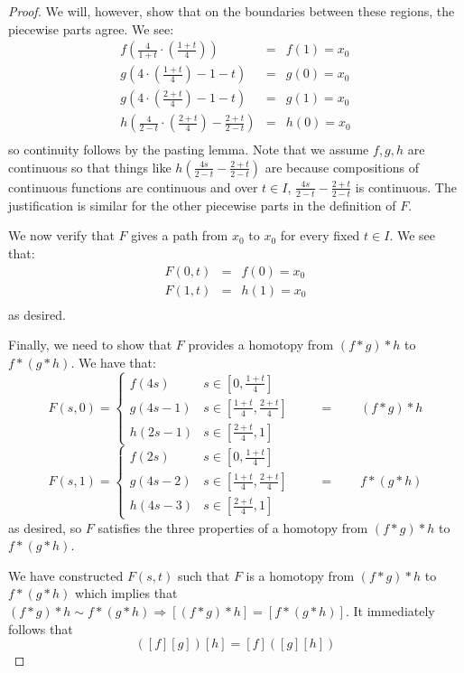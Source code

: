 \begin{proof}
	We will, however, show that on the boundaries between these regions, the piecewise parts agree. We see: 
	\begin{eqnarray*}
		f\left(\frac{4}{1+t} \cdot \left(\frac{1+t}4\right)\right) & = & f(1) = x_0 \\
		g\left(4\cdot\left(\frac{1+t}4\right)-1-t\right) & = & g(0) = x_0\\
		g\left(4\cdot\left(\frac{2+t}4\right)-1-t\right) & = & g(1) = x_0\\
		h\left(\frac{4}{2-t} \cdot \left(\frac{2+t}4\right)- \frac{2+t}{2-t}\right) & = & h(0) = x_0\\
	\end{eqnarray*}
	so continuity follows by the pasting lemma. Note that we assume $f,g,h$ are continuous so that things like $h\left(\frac{4s}{2-t} - \frac{2+t}{2-t} \right)$ are because compositions of continuous functions are continuous and over $t\in I$, $\frac{4s}{2-t} - \frac{2+t}{2-t}$ is continuous. The justification is similar for the other piecewise parts in the definition of $F$. 
	
	We now verify that $F$ gives a path from $x_0$ to $x_0$ for every fixed $t\in I$. We see that: 
	\begin{eqnarray*}
		F(0,t) & = & f(0) = x_0\\
		F(1,t) & = & h(1) = x_0\\
	\end{eqnarray*}
	as desired.
	
	Finally, we need to show that $F$ provides a homotopy from $(f*g)*h$ to $f*(g*h)$. We have that:
	\[F(s,0) = 
	\begin{cases}
		f\left(4s \right)& s \in \left[ 0,\frac{1+t}4 \right] \\
		g(4s-1) & s\in \left[\frac{1+t}4, \frac{2+t}4\right] \\
		h\left(2s - 1 \right) & s\in \left[\frac{2+t}4,1\right] 
	\end{cases}
	\qquad = \qquad (f*g)*h \]
	\[F(s,1) = 
	\begin{cases}
		f\left(2s \right)& s \in \left[ 0,\frac{1+t}4 \right] \\
		g(4s-2) & s\in \left[\frac{1+t}4, \frac{2+t}4\right] \\
		h\left(4s - 3 \right) & s\in \left[\frac{2+t}4,1\right] 
	\end{cases}
	\qquad = \qquad f* (g*h)\]
	as desired, so $F$ satisfies the three properties of a homotopy from $(f*g)*h$ to $f*(g*h)$.
	
	We have constructed $F(s,t)$ such that $F$ is a homotopy from $(f*g)*h$ to $f*(g*h)$ which implies that $(f*g)*h \sim f*(g*h) \Rightarrow [(f*g)*h] = [f*(g*h)]$. It immediately follows that
	\[ ([f][g])[h] = [f]([g][h])\]
\end{proof}
